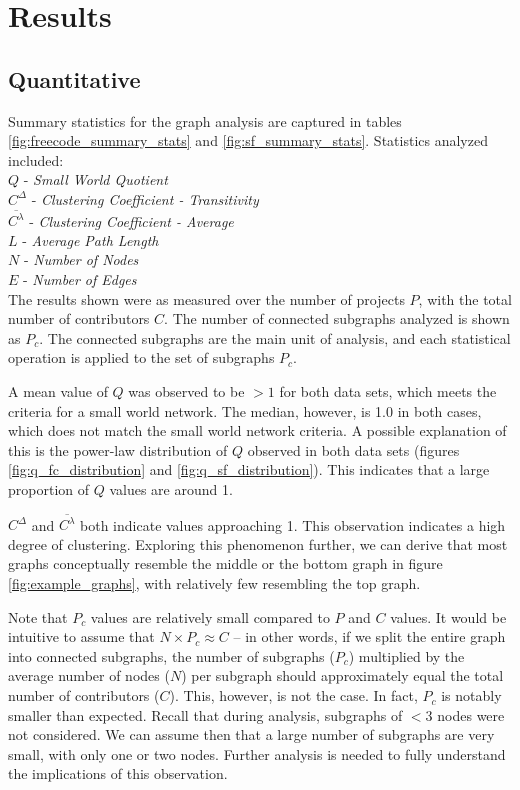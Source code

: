 \documentclass{proc}
\begin{document}
\section{Results}

\subsection{Quantitative}




Summary statistics for the graph analysis are captured in tables \ref{fig:freecode_summary_stats} and \ref{fig:sf_summary_stats}.  Statistics analyzed included:\\
$Q$ - \textit{Small World Quotient}\\
$C^\Delta$ - \textit{Clustering Coefficient - Transitivity}\\
$\overline{C^\lambda}$ - \textit{Clustering Coefficient - Average}\\
$L$ - \textit{Average Path Length}\\
$N$ - \textit{Number of Nodes}\\
$E$ - \textit{Number of Edges}\\
The results shown were as measured over the number of projects $P$, with the total number of contributors $C$. The number of connected subgraphs analyzed is shown as $P_c$. The connected subgraphs are the main unit of analysis, and each statistical operation is applied to the set of subgraphs $P_c$.

A mean value of $Q$ was observed to be $> 1$ for both data sets, which meets the criteria for a small world network\cite{humphries2008network}. The median, however, is 1.0 in both cases, which does not match the small world network criteria. A possible explanation of this is the power-law distribution of $Q$ observed in both data sets (figures \ref{fig:q_fc_distribution} and \ref{fig:q_sf_distribution}). This indicates that a large proportion of $Q$ values are around 1.

$C^\Delta$ and $\overline{C^\lambda}$ both indicate values approaching 1. This observation indicates a high degree of clustering\cite{watts1998collective}. Exploring this phenomenon further, we can derive that most graphs conceptually resemble the middle or the bottom graph in figure \ref{fig:example_graphs}, with relatively few resembling the top graph.

Note that $P_c$ values are relatively small compared to $P$ and $C$ values. It would be intuitive to assume that {$N \times P_c \approx C$} -- in other words, if we split the entire graph into connected subgraphs, the number of subgraphs ($P_c$) multiplied by the average number of nodes ($N$) per subgraph should approximately equal the total number of contributors ($C$). This, however, is not the case. In fact, $P_c$ is notably smaller than expected. Recall that during analysis, subgraphs of {$< 3$} nodes were not considered. We can assume then that a large number of subgraphs are very small, with only one or two nodes. Further analysis is needed to fully understand the implications of this observation.
\end{document}
